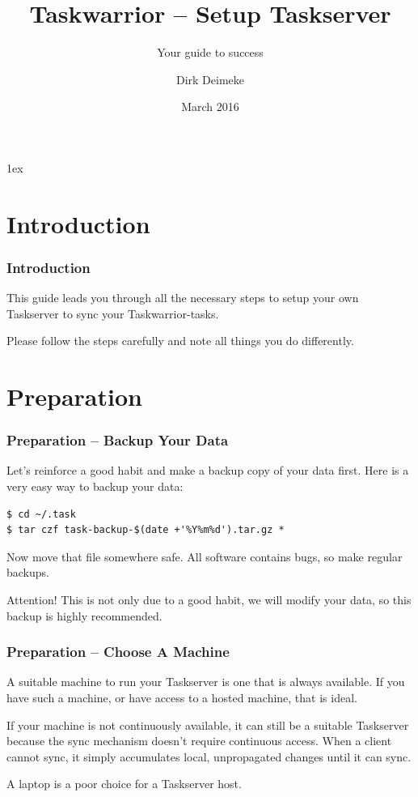 \documentclass[t,handout]{beamer}
\title{Taskwarrior -- Setup Taskserver}
\subtitle{Your guide to success}
\author[Deimeke, Dirk]{Dirk Deimeke}
\institute[Taskwarrior Academy]{Taskwarrior Academy}
\date{March 2016}
\begin{document}



\parskip1ex

\section{Introduction}

\begin{frame}[fragile]\frametitle{Introduction}
    \vfill
    This guide leads you through all the necessary steps to setup your own Taskserver to sync your Taskwarrior-tasks.

    Please follow the steps carefully and note all things you do differently.
    \vfill
\end{frame}

\section{Preparation}

\begin{frame}[fragile]\frametitle{Preparation -- Backup Your Data}\label{backup}
    Let's reinforce a good habit and make a backup copy of your data first. Here is a very easy way to backup your data:

    \begin{lstlisting}
$ cd ~/.task
$ tar czf task-backup-$(date +'%Y%m%d').tar.gz *
    \end{lstlisting}

    Now move that file somewhere safe. All software contains bugs, so make regular backups.

    \vfill
	\begin{alertblock}{Attention!}
		This is not only due to a good habit, we will modify your data, so this backup is highly recommended.
	\end{alertblock}
\end{frame}

\begin{frame}[fragile]\frametitle{Preparation -- Choose A  Machine}
	A suitable machine to run your Taskserver is one that is always available. If you have such a machine, or have access to a hosted machine, that is ideal.

	If your machine is not continuously available, it can still be a suitable Taskserver because the sync mechanism doesn't require continuous access. When a client cannot sync, it simply accumulates local, unpropagated changes until it can sync.

	A laptop is a poor choice for a Taskserver host.
\end{frame}
\end{document}
